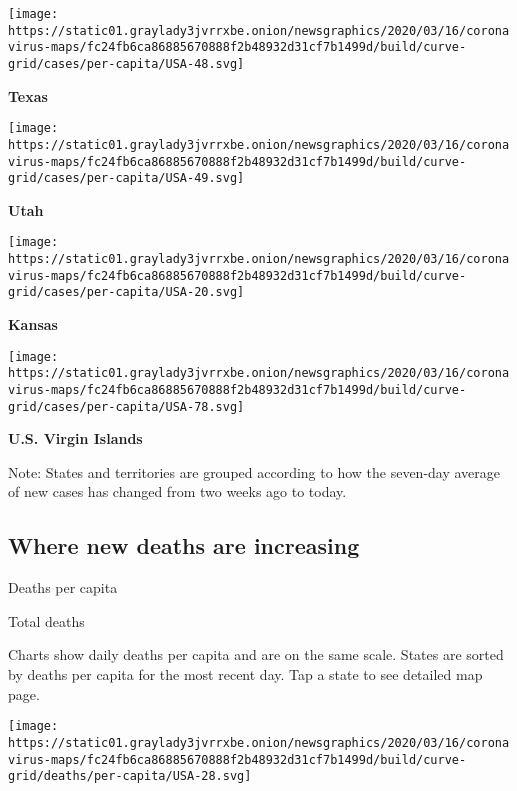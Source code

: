 \texttt{[image: https://static01.graylady3jvrrxbe.onion/newsgraphics/2020/03/16/coronavirus-maps/fc24fb6ca86885670888f2b48932d31cf7b1499d/build/curve-grid/cases/per-capita/USA-48.svg]}

\textbf{Texas}

\href{https://www.nytimes3xbfgragh.onion/interactive/2020/us/utah-coronavirus-cases.html}{}

\texttt{[image: https://static01.graylady3jvrrxbe.onion/newsgraphics/2020/03/16/coronavirus-maps/fc24fb6ca86885670888f2b48932d31cf7b1499d/build/curve-grid/cases/per-capita/USA-49.svg]}

\textbf{Utah}

\href{https://www.nytimes3xbfgragh.onion/interactive/2020/us/kansas-coronavirus-cases.html}{}

\texttt{[image: https://static01.graylady3jvrrxbe.onion/newsgraphics/2020/03/16/coronavirus-maps/fc24fb6ca86885670888f2b48932d31cf7b1499d/build/curve-grid/cases/per-capita/USA-20.svg]}

\textbf{Kansas}

\texttt{[image: https://static01.graylady3jvrrxbe.onion/newsgraphics/2020/03/16/coronavirus-maps/fc24fb6ca86885670888f2b48932d31cf7b1499d/build/curve-grid/cases/per-capita/USA-78.svg]}

\textbf{U.S. Virgin Islands}

Note: States and territories are grouped according to how the seven-day
average of new cases has changed from two weeks ago to today.

\hypertarget{where-new-deaths-are-increasing}{%
\subsection{Where new deaths are
increasing}\label{where-new-deaths-are-increasing}}

Deaths per capita

Total deaths

Charts show daily deaths per capita and are on the same scale. States
are sorted by deaths per capita for the most recent day. Tap a state to
see detailed map page.

\href{https://www.nytimes3xbfgragh.onion/interactive/2020/us/mississippi-coronavirus-cases.html}{}

\texttt{[image: https://static01.graylady3jvrrxbe.onion/newsgraphics/2020/03/16/coronavirus-maps/fc24fb6ca86885670888f2b48932d31cf7b1499d/build/curve-grid/deaths/per-capita/USA-28.svg]}


